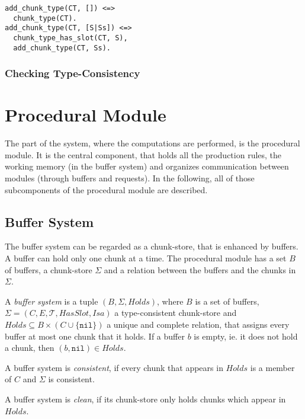 \begin{lstlisting}[caption={rules for \texttt{add\_chunk\_type}}]
add_chunk_type(CT, []) <=> 
  chunk_type(CT).
add_chunk_type(CT, [S|Ss]) <=> 
  chunk_type_has_slot(CT, S), 
  add_chunk_type(CT, Ss).
\end{lstlisting}





\subsubsection{Checking Type-Consistency}


\section{Procedural Module}

The part of the system, where the computations are performed, is the procedural module. It is the central component, that holds all the production rules, the working memory (in the buffer system) and organizes communication between modules (through buffers and requests). In the following, all of those subcomponents of the procedural module are described.

\subsection{Buffer System}

The buffer system can be regarded as a chunk-store, that is enhanced by buffers. A buffer can hold only one chunk at a time. The procedural module has a set $B$ of buffers, a chunk-store $\Sigma$ and a relation between the buffers and the chunks in $\Sigma$.

\begin{definition}
\label{def:buffer_system}
A \emph{buffer system} is a tuple $(B,\Sigma,Holds)$, where $B$ is a set of buffers, $\Sigma = (C, E, \mathcal{T}, HasSlot, Isa)$ a type-consistent chunk-store and $Holds \subseteq B \times (C \cup \{ \mathtt{nil} \})$ a unique and complete relation, that assigns every buffer at most one chunk that it holds. If a buffer $b$ is empty, ie. it does not hold a chunk, then $(b,\mathtt{nil}) \in Holds$.

A buffer system is \emph{consistent}, if every chunk that appears in $Holds$ is a member of $C$ and $\Sigma$ is consistent.

A buffer system is \emph{clean}, if its chunk-store only holds chunks which appear in $Holds$.
\end{definition}

